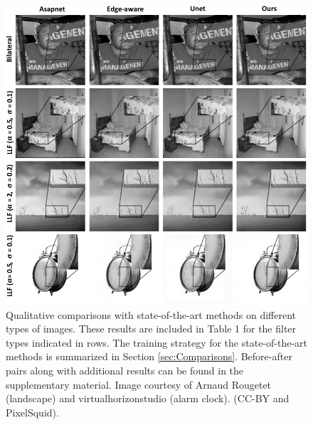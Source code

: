 \begin{figure}%
  \centering
  \includegraphics[width=.9\linewidth]{Chapters/detail-retouching-figs/Qualitative_zoomed.pdf}
    \caption{Qualitative comparisons with state-of-the-art methods on different types of images. These results are included in Table 1 for the filter types indicated in rows. The training strategy for the state-of-the-art methods is summarized in Section \ref{sec:Comparisons}. Before-after pairs along with additional results can be found in the supplementary material. Image courtesy of Arnaud Rougetet (landscape) and virtualhorizonstudio (alarm clock). (CC-BY and PixelSquid).} 

   \label{fig:QualitativeComp}%
\end{figure}


